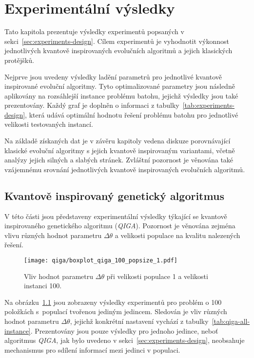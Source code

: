\chapter{Experimentální výsledky} \label{chapt:experiments}
Tato kapitola prezentuje výsledky experimentů popsaných v sekci~\ref{sec:experiments-design}. 
Cílem experimentů je vyhodnotit výkonnost jednotlivých kvantově inspirovaných evolučních algoritmů a jejich klasických protějšků. 

Nejprve jsou uvedeny výsledky ladění parametrů pro jednotlivé kvantově inspirované evoluční algoritmy. 
Tyto optimalizované parametry jsou následně aplikovány na rozsáhlejší instance problému batohu, jejichž výsledky jsou také prezentovány. 
Každý graf je doplněn o informaci z tabulky~\ref{tab:experiments-design}, která udává optimální hodnotu řešení problému batohu pro jednotlivé velikosti testovaných instancí.

Na základě získaných dat je v závěru kapitoly vedena diskuze porovnávající klasické evoluční algoritmy s jejich kvantově inspirovaným variantami, včetně analýzy jejich silných a slabých stránek. 
Zvláštní pozornost je věnována také vzájemnému srovnání jednotlivých kvantově inspirovaných evolučních algoritmů.

\section{Kvantově inspirovaný genetický algoritmus}\label{sec:exp-qisa}
V této části jsou představeny experimentální výsledky týkající se kvantově inspirovaného genetického algoritmu (\emph{QIGA}). 
Pozornost je věnována zejména vlivu různých hodnot parametru $\Delta\theta$ a velikosti populace na kvalitu nalezených řešení. 

\begin{figure}[ht!]
    \centering
    \texttt{[image: qiga/boxplot\_qiga\_100\_popsize\_1.pdf]}
    \caption{Vliv hodnot parametru $\Delta\theta$ při velikosti populace 1 a velikosti instanci 100.}
    \label{fig:qiga-pop1}
\end{figure}

Na obrázku~\ref{fig:qiga-pop1} jsou zobrazeny výsledky experimentů pro problém o 100 položkách s~populací tvořenou jediným jedincem.
Sledován je vliv různých hodnot parametru $\Delta\theta$, jejichž konkrétní nastavení vychází z tabulky~\ref{tab:qiga-all-instance}. 
Prezentovány jsou pouze výsledky pro jednoho jedince, neboť algoritmus \emph{QIGA}, jak bylo uvedeno v sekci~\ref{sec:experiments-design}, neobsahuje mechanismus pro sdílení informací mezi jedinci v populaci. 

